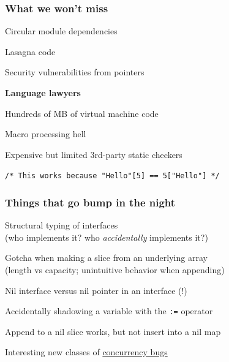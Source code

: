 \documentclass[handout,compress,t,11pt]{beamer}
\begin{document}
\begin{frame}[fragile]
    \frametitle{What we won't miss}
    Circular module dependencies \par
    \vspace{0.6\baselineskip}
    Lasagna code \par
    \vspace{0.6\baselineskip}
    Security vulnerabilities from pointers \par
    \vspace{0.6\baselineskip}
    {\bf Language lawyers} \par
    \vspace{0.6\baselineskip}
    Hundreds of MB of virtual machine code \par
    \vspace{0.6\baselineskip}
    Macro processing hell \par
    \vspace{0.6\baselineskip}
    Expensive but limited 3rd-party static checkers \par
    \vspace{0.6\baselineskip}
    {\small\tt /* This works because "Hello"[5] == 5["Hello"] */}
\end{frame}

{%
\begin{frame}[fragile]
    \frametitle{{\bf Things that go bump in the night}}
    Structural typing of interfaces \\
    (who implements it? who {\em accidentally} implements it?) \par
    \vspace{\baselineskip}
    Gotcha when making a slice from an underlying array \\
    (length vs capacity; unintuitive behavior when appending) \par
    \vspace{\baselineskip}
    Nil interface versus nil pointer in an interface (!) \par
    \vspace{\baselineskip}
    Accidentally shadowing a variable with the {\tt :=} operator \par
    \vspace{\baselineskip}
    Append to a nil slice works, but not insert into a nil map \par
    \vspace{\baselineskip}
    Interesting new classes of \href{https://songlh.github.io/paper/go-study.pdf}{concurrency bugs} \par
\end{frame}
}%
\end{document}
